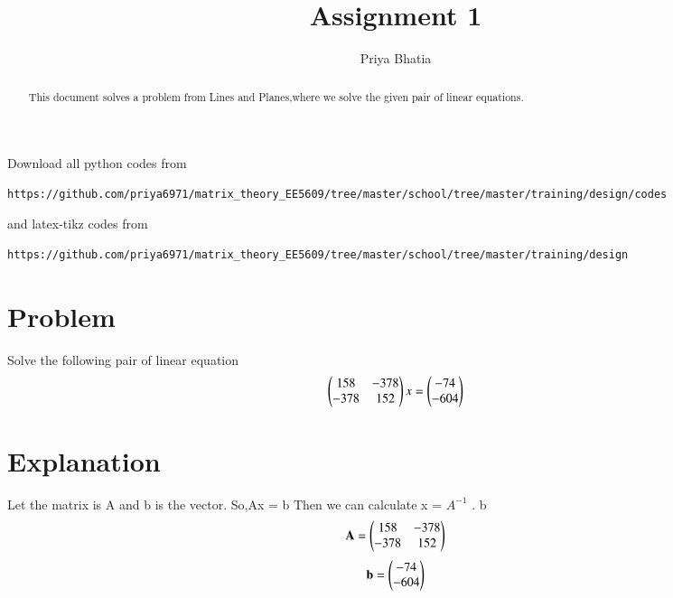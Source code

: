 \documentclass[journal,12pt,twocolumn]{IEEEtran}
\begin{document}
     \def\rightbox#1{\makebox[0in][r]{#1}}
     \def\centbox#1{\makebox[0in]{#1}}
     \def\topbox#1{\raisebox{-\baselineskip}[0in][0in]{#1}}
     \def\midbox#1{\raisebox{-0.5\baselineskip}[0in][0in]{#1}}
\vspace{3cm}
\title{Assignment 1}
\author{Priya Bhatia}
\maketitle
\newpage
\bigskip
\renewcommand{\thefigure}{\theenumi}
\renewcommand{\thetable}{\theenumi}
\begin{abstract}
This document solves a problem from Lines and Planes,where we solve the given pair of linear equations.
\end{abstract}
Download all python codes from
\begin{lstlisting}
https://github.com/priya6971/matrix_theory_EE5609/tree/master/school/tree/master/training/design/codes
\end{lstlisting}
%
and latex-tikz codes from
%
\begin{lstlisting}
https://github.com/priya6971/matrix_theory_EE5609/tree/master/school/tree/master/training/design
\end{lstlisting}
%
\section{Problem}
Solve the following pair of linear equation
\begin{align}
\begin{pmatrix}  158 & -378 \\ -378 & 152\end{pmatrix} x =
\begin{pmatrix}  -74 \\ -604\end{pmatrix}
\end{align}
\section{Explanation}
Let the matrix is A and b is the vector.
So,Ax = b
Then we can calculate x = $A^{-1}$ . b
\begin{align}
\mathbf{A} = \begin{pmatrix}158 & -378 \\ -378 & 152\end{pmatrix}
\end{align}
\begin{align}
\mathbf{b} = \begin{pmatrix}-74 \\ -604\end{pmatrix}
\end{align}
\end{document}
